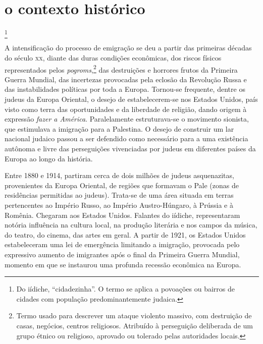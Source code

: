 \section{o contexto histórico}

\footnote{Do iídiche, ``cidadezinha''. O termo se aplica a povoações ou bairros de cidades com população predominantemente judaica.} 

A intensificação do processo de emigração se deu a partir das primeiras décadas do século \textsc{xx}, diante das duras condições econômicas, dos riscos físicos representados pelos
\textit{pogroms},\footnote{Termo usado para descrever um ataque violento massivo, com destruição de casas, negócios, centros religiosos. Atribuído à perseguição deliberada de um grupo étnico ou religioso, aprovado ou tolerado pelas autoridades locais.} das destruições e horrores frutos da Primeira Guerra Mundial,
das incertezas provocadas pela eclosão da Revolução Russa e das
instabilidades políticas por toda a Europa. Tornou-se frequente, dentre os
judeus da Europa Oriental, o desejo de estabelecerem-se nos Estados
Unidos, país visto como terra das oportunidades e da liberdade de
religião, dando origem à expressão \textit{fazer a América}. Paralelamente estruturava-se o movimento sionista, que estimulava a imigração para a Palestina. O desejo de construir um lar nacional judaico passou a ser defendido como necessário para a uma existência autônoma e livre das perseguições vivenciadas por judeus em diferentes países da Europa ao longo da história.

Entre 1880 e 1914, partiram cerca de dois milhões de judeus
asquenazitas, provenientes da Europa Oriental, de regiões que formavam o
Pale (zonas de residências permitidas ao judeus). Trata-se de uma área
situada em terras pertencentes ao Império Russo, ao Império
Austro-Húngaro, à Prússia e à Romênia. Chegaram aos Estados Unidos.
Falantes do iídiche, representaram notória influência na cultura local,
na produção literária e nos campos da música, do teatro, do cinema, das
artes em geral. A partir de 1921, os Estados Unidos estabeleceram uma
lei de emergência limitando a imigração, provocada pelo expressivo
aumento de imigrantes após o final da Primeira Guerra Mundial, momento
em que se instaurou uma profunda recessão econômica na Europa.

